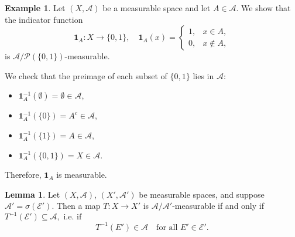 \documentclass[12pt]{article}
\theoremstyle{definition}
\newtheorem{lemma}[theorem]{Lemma}
\newtheorem{example}{Example}[section]
\begin{document}
\medskip
\begin{example}
Let \( (X, \mathcal{A}) \) be a measurable space and let \( A \in \mathcal{A} \). We show that the indicator function
\[
\mathbf{1}_A : X \to \{0, 1\}, \quad
\mathbf{1}_A(x) =
\begin{cases}
1, & x \in A, \\
0, & x \notin A,
\end{cases}
\]
is \( \mathcal{A} / \mathcal{P}(\{0, 1\}) \)-measurable.

We check that the preimage of each subset of \( \{0, 1\} \) lies in \( \mathcal{A} \):
\begin{itemize}
    \item \( \mathbf{1}_A^{-1}(\emptyset) = \emptyset \in \mathcal{A} \),
    \item \( \mathbf{1}_A^{-1}(\{0\}) = A^c \in \mathcal{A} \),
    \item \( \mathbf{1}_A^{-1}(\{1\}) = A \in \mathcal{A} \),
    \item \( \mathbf{1}_A^{-1}(\{0, 1\}) = X \in \mathcal{A} \).
\end{itemize}
Therefore, \( \mathbf{1}_A \) is measurable.
\end{example}

\medskip
\begin{lemma}
Let \( (X, \mathcal{A}) \), \( (X', \mathcal{A}') \) be measurable spaces, and suppose \( \mathcal{A}' = \sigma(\mathcal{E}') \). Then a map \( T : X \to X' \) is \( \mathcal{A} / \mathcal{A}' \)-measurable if and only if \( T^{-1}(\mathcal{E}') \subseteq \mathcal{A}, \text{ i.e. if } \)
\[
T^{-1}(E') \in \mathcal{A} \quad \text{for all } E' \in \mathcal{E}'.
\]
\end{lemma}
\end{document}
